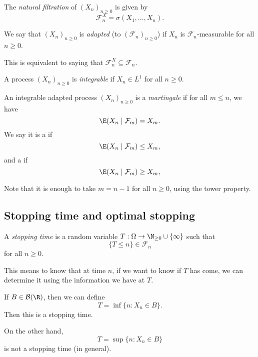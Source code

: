 \documentclass[a4paper]{article}
\begin{document}
\begin{defi}
  The \emph{natural filtration} of $(X_n)_{n \geq 0}$ is given by
  \[
    \mathcal{F}_n^X  = \sigma(X_1, \ldots, X_n).
  \]
\end{defi}

\begin{defi}
  We say that $(X_n)_{n \geq 0}$ is \emph{adapted} (to $(\mathcal{F}_n)_{n \geq 0}$) if $X_n$ is $\mathcal{F}_n$-measurable for all $n \geq 0$.

  This is equivalent to saying that $\mathcal{F}^X_n \subseteq \mathcal{F}_n$.
\end{defi}

\begin{defi}
  A process $(X_n)_{n \geq 0}$ is \emph{integrable} if $X_n \in L^1$ for all $n \geq 0$.
\end{defi}

\begin{defi}[Martingale]
  An integrable adapted process $(X_n)_{n \geq 0}$ is a \emph{martingale} if for all $m \leq n$, we have
  \[
    \E(X_n \mid \mathcal{F}_m) = X_m.
  \]
  We say it is a  if
  \[
    \E(X_n \mid \mathcal{F}_m) \leq X_m,
  \]
  and a  if
  \[
    \E(X_n \mid \mathcal{F}_m) \geq X_m,
  \]
\end{defi}

Note that it is enough to take $m = n - 1$ for all $n \geq 0$, using the tower property.

\subsection{Stopping time and optimal stopping}

\begin{defi}
  A \emph{stopping time} is a random variable $T: \Omega \to \N_{ \geq 0} \cup \{\infty\}$ such that
  \[
    \{T \leq n\} \in \mathcal{F}_n
  \]
  for all $n \geq 0$.
\end{defi}
This means to know that at time $n$, if we want to know if $T$ has come, we can determine it using the information we have at $T$.

\begin{eg}
  If $B \in \mathcal{B}(\R)$, then we can define
  \[
    T = \inf \{n : X_n \in B\}.
  \]
  Then this is a stopping time.

  On the other hand,
  \[
    T = \sup \{n: X_n \in B\}
  \]
  is not a stopping time (in general).
\end{eg}
\end{document}
